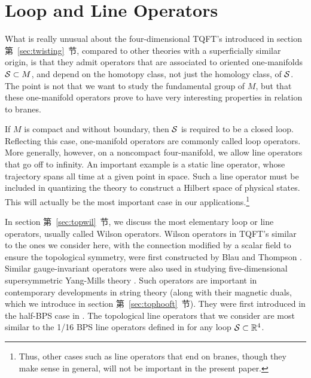 
\section{Loop and Line Operators}

\label{sec:loopop} 

 What is really unusual about the four-dimensional TQFT's
introduced in section 第~\ref{sec:twisting}~节, compared to other theories with a
superficially similar origin, is that they admit operators that
are associated to oriented one-manifolds ${\cal S}\subset M$, and
depend on the homotopy class, not just the homology class, of
$\cal S$. The point is not that we want to study the fundamental
group of $M$, but that these one-manifold operators prove to have
very interesting properties in relation to branes.

If $M$ is compact and without boundary, then $\cal S$ is required
to be a closed loop. Reflecting this case, one-manifold operators
are commonly called loop operators.  More generally, however, on a
noncompact  four-manifold, we allow line operators that go off to
infinity. An important example is a static line operator, whose
trajectory spans all time at a given point in space.  Such a line
operator must be included in quantizing the theory to construct a
Hilbert space of physical states.  This will actually be the most
important case in our applications.\footnote{Thus, other cases such as
line operators that end on branes, though they make sense in
general, will not be important in the present paper.}

 
 

In section 第~\ref{sec:topwil}~节, we discuss the most elementary loop or line
operators, usually called Wilson  operators. Wilson operators in
TQFT's similar to the ones we consider here, with the connection
modified by a scalar field to ensure the topological symmetry,
were first constructed by Blau and Thompson \cite{ref84}. Similar
gauge-invariant operators were also used in studying
five-dimensional supersymmetric Yang-Mills theory \cite{ref85}. Such
operators are important in contemporary developments in string
theory (along with their magnetic duals, which we introduce in
section 第~\ref{sec:tophooft}~节). They were first introduced in the half-BPS
case in \cite{ref86,ref87}. The topological line operators that we
consider are most similar to the 1/16 BPS line operators defined
in \cite{ref88} for any
loop ${\cal S}\subset \Bbb{R}^4$.

